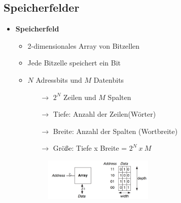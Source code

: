 \documentclass[11pt,a4paper]{article}
\begin{document}
\subsection{Speicherfelder}
\begin{itemize}

\item \textbf{Speicherfeld}
	\begin{itemize}
	\item 2-dimensionales Array von Bitzellen
	\item Jede Bitzelle speichert ein Bit
	\item $N$ Adressbits und $M$ Datenbits
		\begin{itemize}
		\item[$\rightarrow$] $2^N$ Zeilen und $M$ Spalten
		\item[$\rightarrow$] Tiefe: Anzahl der Zeilen(Wörter)
		\item[$\rightarrow$] Breite: Anzahl der Spalten (Wortbreite)
		\item[$\rightarrow$] Größe: Tiefe x Breite = $2^N~x~M$
		\end{itemize}
	\item[]
		\begin{figure}[H]
		\begin{center}
		\includegraphics[height=2cm]{speicherfeld}
		\end{center}
		\end{figure}
		

\end{itemize}
\end{itemize}
\end{document}
